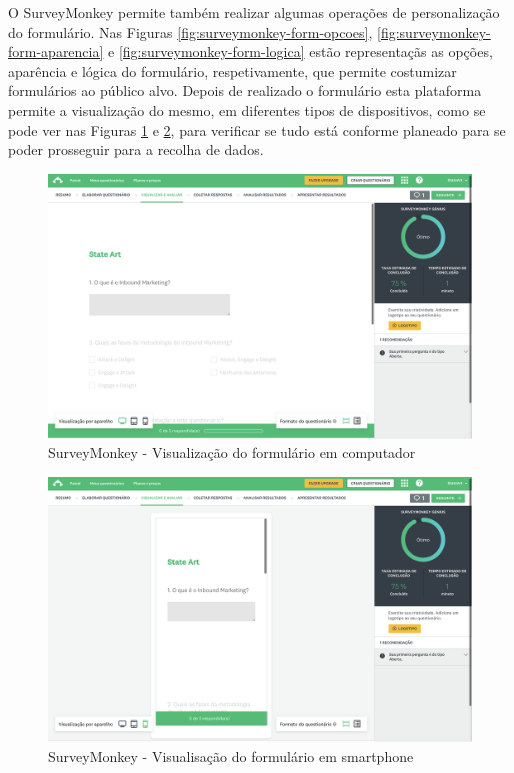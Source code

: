 O SurveyMonkey permite também realizar algumas operações de personalização do formulário. Nas Figuras \ref{fig:surveymonkey-form-opcoes}, \ref{fig:surveymonkey-form-aparencia} e \ref{fig:surveymonkey-form-logica} estão representaçãs as opções, aparência e lógica do formulário, respetivamente, que permite costumizar formulários ao público alvo. 
Depois de realizado o formulário esta plataforma permite a visualização do mesmo, em diferentes tipos de dispositivos, como se pode ver nas Figuras \ref{fig:surveymonkey-form-test-pc} e \ref{fig:surveymonkey-form-test-phone}, para verificar se tudo está conforme planeado para se poder prosseguir para a recolha de dados. 
 \newpage

\begin{figure}[ht!]
	\begin{center}
		\includegraphics[width=1\textwidth]{img/sm/surveymonkey-form-test-pc}
		\caption{SurveyMonkey - Visualização do formulário em computador }
		\label{fig:surveymonkey-form-test-pc}
	\end{center}
\end{figure}

\begin{figure}[ht!]
	\begin{center}
		\includegraphics[width=1\textwidth]{img/sm/surveymonkey-form-test-phone}
		\caption{SurveyMonkey - Visualisação do formulário em smartphone }
		\label{fig:surveymonkey-form-test-phone}
	\end{center}
\end{figure}

